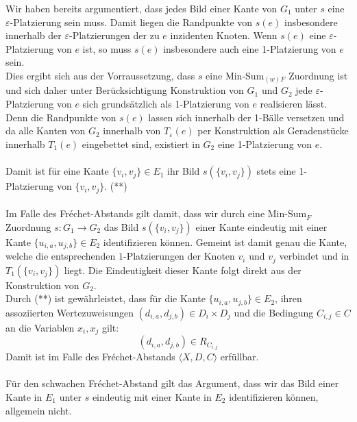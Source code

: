 \documentclass[a4paper, 12pt, twoside]{article}
\theoremstyle{Format1} %
\begin{document}
Wir haben bereits argumentiert, dass jedes Bild einer Kante von $G_1$ unter $s$ eine $\varepsilon$-Platzierung sein muss.
Damit liegen die Randpunkte von $s(e)$ insbesondere innerhalb der $\varepsilon$-Platzierungen der zu $e$ inzidenten Knoten.
Wenn $s(e)$ eine $\varepsilon$-Platzierung von $e$ ist, so muss $s(e)$ insbesondere auch eine 1-Platzierung von $e$ sein.
\\
Dies ergibt sich aus der Vorraussetzung, dass $s$ eine Min-Sum$_{(w)F}$ Zuordnung ist und sich daher unter Berücksichtigung Konstruktion
von $G_1$ und $G_2$ jede $\varepsilon$-Platzierung von $e$ sich grundsätzlich als 1-Platzierung von $e$ realisieren lässt.
\\
Denn die Randpunkte von $s(e)$ lassen sich innerhalb der 1-Bälle versetzen und da alle Kanten von $G_2$ innerhalb von $T_{\varepsilon}(e)$
per Konstruktion als Geradenstücke innerhalb $T_1(e)$ eingebettet sind, existiert in $G_2$ eine 1-Platzierung von $e$.
\\
\\
Damit ist für eine Kante $\{v_i, v_j\} \in E_1$ ihr Bild $s(\{v_i, v_j\})$ stets eine 1-Platzierung von $\{v_i, v_j\}$. (**)
\\
\\
Im Falle des Fréchet-Abstands gilt damit, dass wir durch eine $\text{Min-Sum}_F$ Zuordnung $s: G_1 \to G_2$ das Bild $s(\{v_i, v_j\})$ einer Kante
eindeutig mit einer Kante $\{u_{i,a}, u_{j,b}\} \in E_2$ identifizieren können. Gemeint ist damit genau die Kante, welche
die entsprechenden $1$-Platzierungen der Knoten $v_i$ und $v_j$ verbindet und in $T_1(\{v_i, v_j\})$ liegt. Die Eindeutigkeit dieser Kante folgt direkt aus der
Konstruktion von $G_2$.
\\
Durch (**) ist gewährleistet, dass für die Kante $\{u_{i,a}, u_{j,b}\} \in E_2$, ihren assoziierten Wertezuweisungen $(d_{i,a}, d_{j,b}) \in D_i \times D_j$
und die Bedingung $C_{i,j} \in C$ an die Variablen $x_i, x_j$ gilt:
$$(d_{i,a},d_{j,b}) \in R_{C_{i,j}}$$
Damit ist im Falle des Fréchet-Abstands $\langle X,D,C \rangle$ erfüllbar.
\\
\\
Für den schwachen Fréchet-Abstand gilt das Argument, dass wir das Bild einer Kante in $E_1$ unter $s$ eindeutig mit einer Kante in $E_2$ identifizieren können, allgemein nicht.
\end{document}

